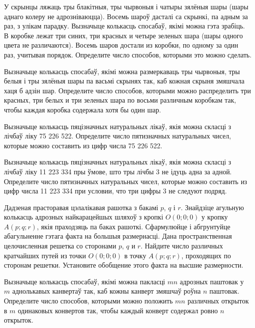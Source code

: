 \begin{problemList}
\bigskip

\problemItemSimple
{У скрынцы ляжаць тры блакітныя, тры чырвоныя і чатыры зялёныя шары (шары аднаго колеру
не адрозніваюцца). Восемь шароў дасталі са скрынкі, па адным за раз, з улікам парадку.
Вызначыце колькасць спосабаў, якімі можна гэта зрабіць.}
{В коробке лежат три синих, три красных и четыре зеленых шара (шары
одного цвета не различаются). Восемь шаров достали из коробки, по одному
за один раз, учитывая порядок. Определите число способов, которыми
это можно сделать.}

\bigskip

\problemItemSimple
{Вызначыце колькасць спосабаў, якімі можна размеркаваць тры чырвоныя, тры белыя і
тры зялёныя шары па васьмі скрынях так, каб кожная скрыня змяшчала хаця б адзін шар.}
{Определите число способов, которыми можно распределить три красных,
три белых и три зеленых шара по восьми различным коробкам так, чтобы
каждая коробка содержала хотя бы один шар.}

\bigskip

\problemItemSimple
{Вызначыце колькасць пяцізначных натуральных лікаў, якія можна скласці
з лічбаў ліку 75\,\,226\,\,522.}
{Определите число пятизначных натуральных чисел, которые можно составить
из цифр числа 75\,\,226\,\,522.}

\bigskip

\problemItemSimple
{Вызначыце колькасць пяцізначных натуральных лікаў, якія можна скласці
з лічбаў ліку 11\,\,223\,\,334 пры ўмове, што тры лічбы 3 не ідуць адна за адной.}
{Определите число пятизначных натуральных чисел, которые можно составить
из цифр числа 11\,\,223\,\,334 при условии, что три цифры 3 не следуют подряд.}

\bigskip

\problemItemSimple
{Дадзеная прасторавая цэлалікавая рашотка з бакамі $p$, $q$ і $r$.
Знайдзіце агульную колькасць адрозных найкарацейшых шляхоў з кропкі $O(0; 0; 0)$ у кропку
$A(p; q; r)$, якія праходзяць па баках рашоткі. Сфармулюйце і абгрунтуйце абагульненне гэтага
факта на большыя размернасці.}
{Дана пространственная целочисленная решетка со сторонами $p$, $q$ и $r$.
Найдите число различных кратчайших путей из точки $O(0; 0; 0)$ в точку
$A(p; q; r)$, проходящих по сторонам решетки. Установите обобщение этого
факта на высшие размерности.}

\bigskip

\problemItemSimple
{Вызначыце колькасць спосабаў, якімі можна пакласці $mn$ адрозных
паштовак у $m$ аднолькавых канвертаў так, каб кожны канверт змяшчаў
роўна $n$ паштовак.}
{Определите число способов, которыми можно положить $mn$ различных
открыток в $m$ одинаковых конвертов так, чтобы каждый конверт содержал
ровно $n$ открыток.}


\end{problemList}
